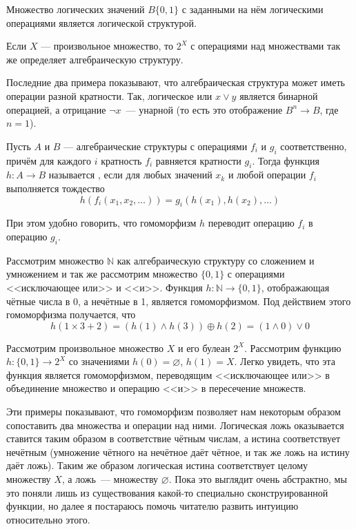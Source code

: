 \begin{example}
	Множество логических значений $B\{0, 1\}$ с заданными на нём логическими операциями является логической структурой.
\end{example}

\begin{example}
	Если $X$ --- произвольное множество, то $2^X$ с операциями над множествами так же определяет алгебраическую структуру.
\end{example}

Последние два примера показывают, что алгебраическая структура может иметь операции разной кратности. Так, логическое или $x\lor y$ является бинарной операцией, а отрицание $\neg x$~--- унарной (то есть это отображение $B^n\to B$, где $n=1$).

\begin{definition}
	Пусть $A$ и $B$ --- алгебраические структуры с операциями $f_i$ и $g_i$ соответственно, причём для каждого $i$ кратность $f_i$ равняется кратности $g_i$. Тогда функция $h:A\to B$ называется , если для любых значений $x_k$ и любой операции $f_i$ выполняется тождество
\[
h(f_i(x_1, x_2, \ldots)) = g_i(h(x_1), h(x_2), \ldots)
\]

При этом удобно говорить, что гомоморфизм $h$ переводит операцию $f_i$ в операцию $g_i$.
\end{definition}

\begin{example}\label{ex:alg_epi}
	Рассмотрим множество $\mathbb{N}$ как алгебраическую структуру со сложением и умножением и так же рассмотрим множество $\{0, 1\}$ с операциями <<исключающее или>> и <<и>>. Функция $h:\mathbb{N}\to\{0, 1\}$, отображающая чётные числа в 0, а нечётные в 1, является гомоморфизмом. Под действием этого гомоморфизма получается, что
\[
h(1\times 3 + 2) = (h(1)\land h(3)) \oplus h(2) = (1\land 0) \lor 0
\]
\end{example}


\begin{example}\label{ex:alg_mono}
	Рассмотрим произвольное множество $X$ и его булеан $2^X$. Рассмотрим функцию $h:\{0, 1\}\to 2^X$ со значениями $h(0)=\varnothing$, $h(1)=X$. Легко увидеть, что эта функция является гомоморфизмом, переводящим <<исключающее или>> в объединение множество и операцию <<и>> в пересечение множеств.
\end{example}

Эти примеры показывают, что гомоморфизм позволяет нам некоторым образом сопоставить два множества и операции над ними. Логическая ложь оказывается ставится таким образом в соответствие чётным числам, а истина соответствует нечётным (умножение чётного на нечётное даёт чётное, и так же ложь на истину даёт ложь). Таким же образом логическая истина соответствует целому множеству $X$, а ложь~--- множеству $\varnothing$. Пока это выглядит очень абстрактно, мы это поняли лишь из существования какой-то специально сконструированной функции, но далее я постараюсь помочь читателю развить интуицию относительно этого.

